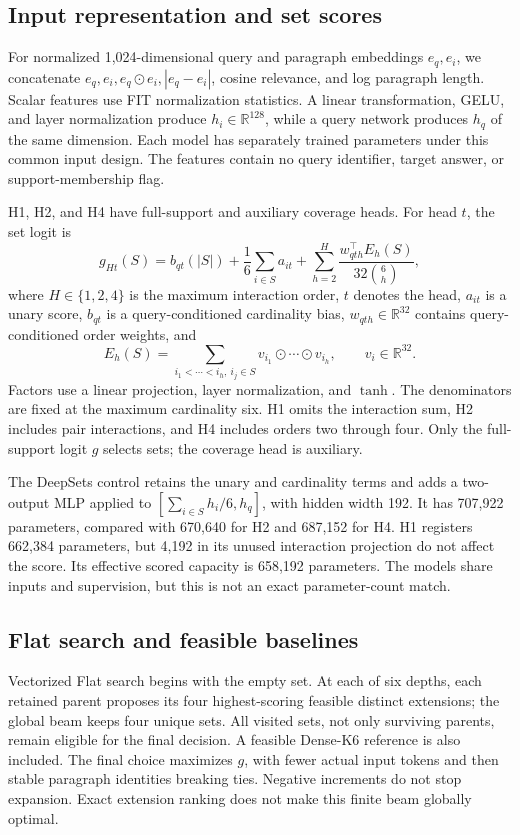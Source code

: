 \documentclass[preprint,12pt]{elsarticle}
\begin{document}
\subsection{Input representation and set scores}
For normalized 1,024-dimensional query and paragraph embeddings $e_q,e_i$, we concatenate $e_q,e_i,e_q\odot e_i,|e_q-e_i|$, cosine relevance, and log paragraph length. Scalar features use FIT normalization statistics. A linear transformation, GELU, and layer normalization produce $h_i\in\mathbb R^{128}$, while a query network produces $h_q$ of the same dimension. Each model has separately trained parameters under this common input design. The features contain no query identifier, target answer, or support-membership flag.

H1, H2, and H4 have full-support and auxiliary coverage heads. For head $t$, the set logit is
\begin{equation}\label{eq:score}
g_{Ht}(S)=b_{qt}(|S|)+\frac{1}{6}\sum_{i\in S}a_{it}
+\sum_{h=2}^{H}\frac{w_{qth}^{\top}E_h(S)}{32\binom{6}{h}},
\end{equation}
where $H\in\{1,2,4\}$ is the maximum interaction order, $t$ denotes the head, $a_{it}$ is a unary score, $b_{qt}$ is a query-conditioned cardinality bias, $w_{qth}\in\mathbb R^{32}$ contains query-conditioned order weights, and
\begin{equation}
E_h(S)=\sum_{i_1<\cdots<i_h,\ i_j\in S}
v_{i_1}\odot\cdots\odot v_{i_h},\qquad v_i\in\mathbb R^{32}.
\end{equation}
Factors use a linear projection, layer normalization, and $\tanh$. The denominators are fixed at the maximum cardinality six. H1 omits the interaction sum, H2 includes pair interactions, and H4 includes orders two through four. Only the full-support logit $g$ selects sets; the coverage head is auxiliary.

The DeepSets control retains the unary and cardinality terms and adds a two-output MLP applied to $[\sum_{i\in S}h_i/6,h_q]$, with hidden width 192. It has 707,922 parameters, compared with 670,640 for H2 and 687,152 for H4. H1 registers 662,384 parameters, but 4,192 in its unused interaction projection do not affect the score. Its effective scored capacity is 658,192 parameters. The models share inputs and supervision, but this is not an exact parameter-count match.

\subsection{Flat search and feasible baselines}
Vectorized Flat search begins with the empty set. At each of six depths, each retained parent proposes its four highest-scoring feasible distinct extensions; the global beam keeps four unique sets. All visited sets, not only surviving parents, remain eligible for the final decision. A feasible Dense-K6 reference is also included. The final choice maximizes $g$, with fewer actual input tokens and then stable paragraph identities breaking ties. Negative increments do not stop expansion. Exact extension ranking does not make this finite beam globally optimal.
\end{document}
